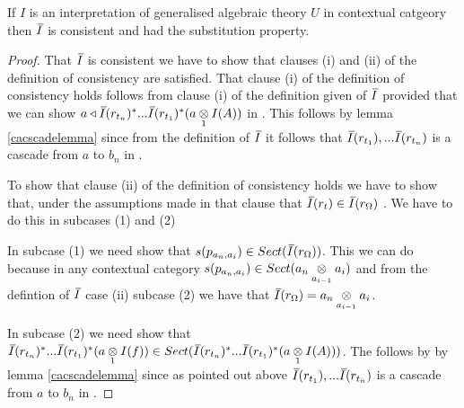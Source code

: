 \newpage
\begin{lemma}
If $I$ is an interpretation of generalised algebraic theory $U$ in contextual catgeory \catcw
then $\Ibar$ is consistent and had the substitution property.
\end{lemma}
\begin{proof}
\newcommand {\forceSOURCEwidth}{\rule{5cm}{0pt}}  %
\newcommand {\forceTARGETwidth}{\rule{2.2cm}{0pt}}
\newcommand{\ssubbedfory}{s_1|y_1,...s_m|y_m}
\newcommand{\clausethreelhs}{(\fmvectorstar (\crossx{a}{g_n}{1}))^* ... (\fmvectorstar (\crossx{a}{g_1}{1})) ^* (\crossx{b_m}{I_A}{1})}
\newcommand{\clausethreerhs}{\fmvectorstar (  \crossx{a}{(\gnvectorstar(\crossx{b_m}{I_A}{1}))}{1} )}

That $\Ibar$ is consistent we have to show that clauses (i) and (ii) of the definition of consistency are satisfied.
That clause (i) of the definition of consistency holds follows  from clause (i) of the definition given of $\Ibar$ provided that
we can show $a \base \Ibar(r_{t_n})^*...\Ibar(r_{t_1})^*(\crossx{a}{I(A)}{1})$ in \catc. 
This follows by lemma \ref{cacscadelemma} since from the definition of $\Ibar$ it follows that $\Ibar(r_{t_1}),...\Ibar(r_{t_n})$
is a cascade from $a$ to $b_n$ in \catc. 

To show that clause (ii) of the definition of consistency holds we have to show that, under the assumptions made in that clause 
that $\Ibar(r_t) \in \Ibar(r_\Omega)$ . We have to do this in subcases (1) and (2)

In subcase (1) we need show that
$s(p_{a_n,a_i}) \in Sect(\Ibar(r_\Omega))$. This we can do because in any contextual category $s(p_{a_n,a_i}) \in Sect(\crossx{a_n}{a_i}{a_{i-1}})$
and from the defintion of $\Ibar$ case (ii) subcase (2) we have that $\Ibar(r_\Omega)=\crossx{a_n}{a_i}{a_{i-1}}$. 


In subcase (2) we need show that
$\Ibar(r_{t_n})^*...\Ibar(r_{t_1})^*(\crossx{a}{I(f)}{1}) \in Sect(\Ibar(r_{t_n})^*...\Ibar(r_{t_1})^*(\crossx{a}{I(A)}{1}))$.
The follows by by lemma \ref{cacscadelemma} since as pointed out above $\Ibar(r_{t_1}),...\Ibar(r_{t_n})$
is a cascade from $a$ to $b_n$ in \catc. 


\newcommand{\tirule}{\gatdisplayrule{\yOmega{m}}{\ofT{t_i}{\Delta_i[t_1 | x_1,...t_{i-1}|x_{i-1}]}}}


\end{proof}
